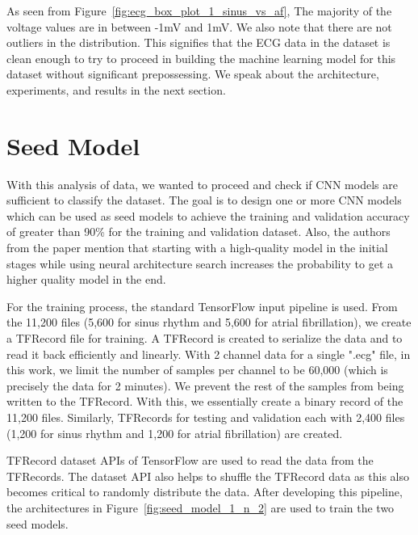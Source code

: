 As seen from Figure~\ref{fig:ecg_box_plot_1_sinus_vs_af}, 
The majority of the voltage values are in between -1mV and 1mV. We also note that there are not outliers in the distribution. This signifies that the ECG data in the dataset is clean enough to try to proceed in building the machine learning model for this dataset without significant prepossessing. We speak about the architecture, experiments, and results in the next section.

\section{Seed Model}
\label{sec:seed_model}

With this analysis of data, we wanted to proceed and check if CNN models are sufficient to classify the dataset. The goal is to design one or more CNN models which can be used as seed models to achieve the training and validation accuracy of greater than 90\% for the training and validation dataset. Also, the authors from the paper \cite{real2019regularized} mention that starting with a high-quality model in the initial stages while using neural architecture search increases the probability to get a higher quality model in the end.

For the training process, the standard TensorFlow input pipeline is used. From the 11,200 files (5,600 for sinus rhythm and 5,600 for atrial fibrillation), we create a TFRecord file for training. A TFRecord is created to serialize the data and to read it back efficiently and linearly. With 2 channel data for a single ".ecg" file, in this work, we limit the number of samples per channel to be 60,000 (which is precisely the data for 2 minutes). We prevent the rest of the samples from being written to the TFRecord. With this, we essentially create a binary record of the 11,200 files. Similarly, TFRecords for testing and validation each with 2,400 files (1,200 for sinus rhythm and 1,200 for atrial fibrillation) are created.

TFRecord dataset APIs of TensorFlow are used to read the data from the TFRecords. The dataset API also helps to shuffle the TFRecord data as this also becomes critical to randomly distribute the data. After developing this pipeline, the architectures in Figure~\ref{fig:seed_model_1_n_2} are used to train the two seed models.

